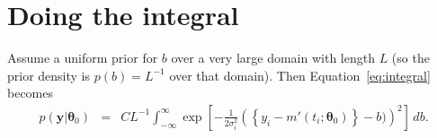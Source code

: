 \documentclass[a4paper, 11pt]{article}
\newcommand{\yy}{\boldsymbol{y}}	%
\newcommand{\btheta}{\boldsymbol{\theta}}  %
\begin{document}
\section{Doing the integral}
Assume a uniform prior for $b$ over a very large domain with length
$L$ (so the prior density is $p(b) = L^{-1}$ over that domain). Then
Equation~\ref{eq:integral} becomes
\begin{eqnarray}
p(\yy | \btheta_0) &=& CL^{-1}\int_{-\infty}^\infty
\exp\left[
-\frac{1}{2\sigma_i^2}
\left(\left\{y_i - m'(t_i; \btheta_0)\right\} - b)
\right)^2
\right]
\, db.
\end{eqnarray}
\end{document}
